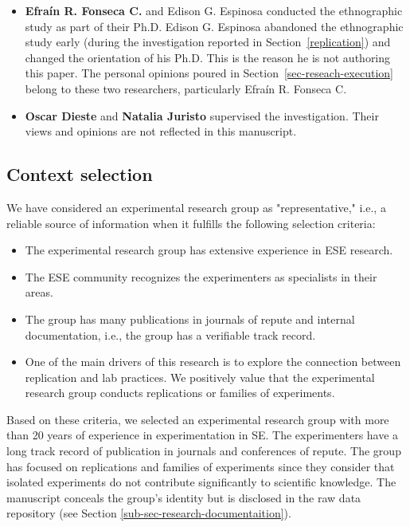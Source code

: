 \begin{itemize}
\item \textbf{Efra\'in R. Fonseca C.} and Edison G. Espinosa conducted the ethnographic study as part of their Ph.D. Edison G. Espinosa abandoned the ethnographic study early (during the investigation reported in Section~\ref{replication}) and changed the orientation of his Ph.D. This is the reason he is not authoring this paper. The personal opinions poured in Section~\ref{sec-reseach-execution} belong to these two researchers, particularly Efra\'in R. Fonseca C.
\item \textbf{Oscar Dieste} and \textbf{Natalia Juristo} supervised the investigation. Their views and opinions are not reflected in this manuscript.
\end{itemize}

\subsection{Context selection}
We have considered an experimental research group as "representative," i.e., a reliable source of information when it fulfills the following selection criteria:

\begin{itemize}
	\item The experimental research group has extensive experience in ESE research.
	\item The ESE community recognizes the experimenters as specialists in their areas.
	\item The group has many publications in journals of repute and internal documentation, i.e., the group has a verifiable track record.
\item One of the main drivers of this research is to explore the connection between replication and lab practices. We positively value that the experimental research group conducts replications or families of experiments.
\end{itemize}

Based on these criteria, we selected an experimental research group with more than 20 years of experience in experimentation in SE. The experimenters have a long track record of publication in journals and conferences of repute. The group has focused on replications and families of experiments since they consider that isolated experiments do not contribute significantly to scientific knowledge. The manuscript conceals the group's identity but is disclosed in the raw data repository (see Section \ref{sub-sec-research-documentaition}).


